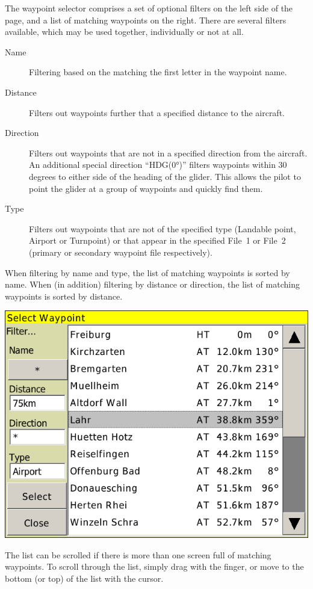 \documentclass[a4paper,12pt]{refrep}
\begin{document}
The waypoint selector comprises a set of optional filters on the left
side of the page, and a list of matching waypoints on the right.
There are several filters available, which may be used together,
individually or not at all.
\begin{description}
\item[Name] Filtering based on the matching the first letter in the waypoint name. 
\item[Distance] Filters out waypoints further that a specified distance to the aircraft.
\item[Direction] Filters out waypoints that are not in a specified direction from the aircraft. 
   An additional special direction ``HDG(0°)'' filters waypoints within 30
   degrees to either side of the heading of the glider.  This allows the pilot to point the glider at a group of
  waypoints and quickly find them.
\item[Type] Filters out waypoints that are not of the specified type
(Landable point, Airport or Turnpoint) or that appear in the specified File~1 or
File~2 (primary or secondary waypoint file respectively).
\end{description}
When filtering by name and type, the list of matching waypoints is
sorted by name. When (in addition) filtering by distance or direction,
 the list of matching waypoints is sorted by distance.

\begin{center}
\includegraphics[angle=0,width=0.8\linewidth,keepaspectratio='true']{figures/dialog-waypointselect.png}
\end{center}

The list can be scrolled if there is more than one screen full of
matching waypoints.  To scroll through the list, simply drag with the finger, or
move to the bottom (or top) of the list with the cursor.   
\end{document}
